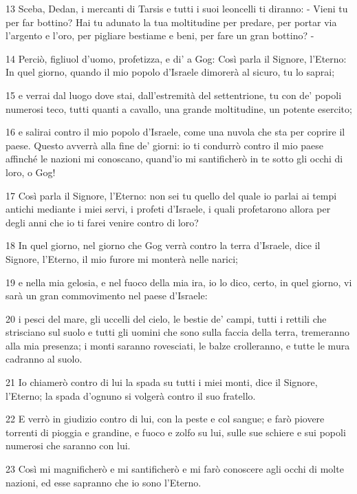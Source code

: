 \par 13 Sceba, Dedan, i mercanti di Tarsis e tutti i suoi leoncelli ti diranno: - Vieni tu per far bottino? Hai tu adunato la tua moltitudine per predare, per portar via l'argento e l'oro, per pigliare bestiame e beni, per fare un gran bottino? -
\par 14 Perciò, figliuol d'uomo, profetizza, e di' a Gog: Così parla il Signore, l'Eterno: In quel giorno, quando il mio popolo d'Israele dimorerà al sicuro, tu lo saprai;
\par 15 e verrai dal luogo dove stai, dall'estremità del settentrione, tu con de' popoli numerosi teco, tutti quanti a cavallo, una grande moltitudine, un potente esercito;
\par 16 e salirai contro il mio popolo d'Israele, come una nuvola che sta per coprire il paese. Questo avverrà alla fine de' giorni: io ti condurrò contro il mio paese affinché le nazioni mi conoscano, quand'io mi santificherò in te sotto gli occhi di loro, o Gog!
\par 17 Così parla il Signore, l'Eterno: non sei tu quello del quale io parlai ai tempi antichi mediante i miei servi, i profeti d'Israele, i quali profetarono allora per degli anni che io ti farei venire contro di loro?
\par 18 In quel giorno, nel giorno che Gog verrà contro la terra d'Israele, dice il Signore, l'Eterno, il mio furore mi monterà nelle narici;
\par 19 e nella mia gelosia, e nel fuoco della mia ira, io lo dico, certo, in quel giorno, vi sarà un gran commovimento nel paese d'Israele:
\par 20 i pesci del mare, gli uccelli del cielo, le bestie de' campi, tutti i rettili che strisciano sul suolo e tutti gli uomini che sono sulla faccia della terra, tremeranno alla mia presenza; i monti saranno rovesciati, le balze crolleranno, e tutte le mura cadranno al suolo.
\par 21 Io chiamerò contro di lui la spada su tutti i miei monti, dice il Signore, l'Eterno; la spada d'ognuno si volgerà contro il suo fratello.
\par 22 E verrò in giudizio contro di lui, con la peste e col sangue; e farò piovere torrenti di pioggia e grandine, e fuoco e zolfo su lui, sulle sue schiere e sui popoli numerosi che saranno con lui.
\par 23 Così mi magnificherò e mi santificherò e mi farò conoscere agli occhi di molte nazioni, ed esse sapranno che io sono l'Eterno.

